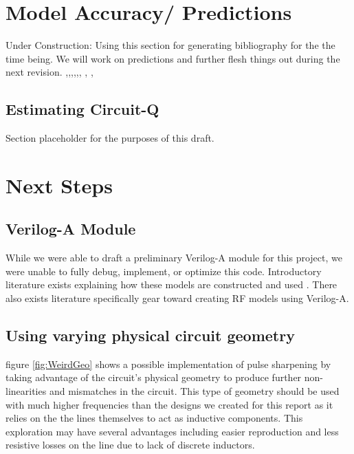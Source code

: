\documentclass[journal]{IEEEtran}
\begin{document}
\section{ Model Accuracy/ Predictions }
Under Construction: Using this section for generating bibliography for the the time being. We will work on predictions and further flesh things out during the next revision.
\cite{ould2011circuit} \cite{distributedAnalogPhase},\cite{ellinger2003varactor},\cite{lee2012nonlinear},\cite{UltraCompact},\cite{EffVaractorCharac},\cite{FastHighVoltageNLTL}, \cite{nikoo2018theory}, \cite{TwoLine},\cite{ComputerExpNLTL}


\subsection{Estimating Circuit-Q}
Section placeholder for the purposes of this draft.


\section{Next Steps}\label{sec:NextSteps}



\subsection{Verilog-A Module}
    While we were able to draft a preliminary Verilog-A module for this project, we were unable to fully debug, implement, or optimize this code. Introductory literature exists explaining how these models are constructed and used \cite{VerilogAFun}. There also exists literature specifically gear toward creating RF models using Verilog-A\cite{VerilogARF}.
    
    




\subsection{Using varying physical circuit geometry}

figure \ref{fig:WeirdGeo} shows a possible implementation of pulse sharpening by taking advantage of the circuit's physical geometry to produce further non-linearities and mismatches in the circuit. This type of geometry should be used with much higher frequencies than the designs we created for this report as it relies on the the lines themselves to act as inductive components. This  exploration may have several advantages including easier reproduction and less resistive losses on the line due to lack of discrete inductors. 
\end{document}
